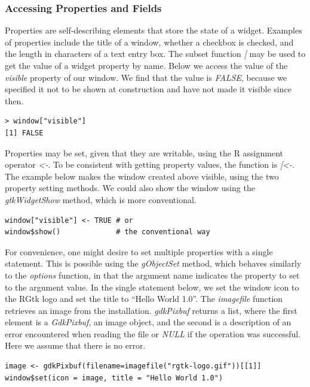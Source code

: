 \documentclass[article]{jss}
\begin{document}
\subsubsection{Accessing Properties and Fields}

Properties are self-describing elements that store the state of a widget.
Examples of properties include the title of a window, whether a checkbox is checked, and
the length in characters of a text entry box. The  subset function 
\emph{[} may be used to get the value of a widget property by name.
Below we access the value of the \emph{visible} property of our window. We
find that the value is \emph{FALSE}, because we specified it not to be shown
at construction and have not made it visible since then.
\begin{verbatim}
> window["visible"]
[1] FALSE
\end{verbatim}

Properties may be set, given that they are writable, using the R assignment 
operator \emph{<-}. To be consistent with getting property values, the function
is \emph{[<-}. The example below makes the window created above visible, using the two
property setting methods. We could also show the window using the 
\emph{gtkWidgetShow} method, which is more conventional.
\begin{verbatim}
window["visible"] <- TRUE # or
window$show()             # the conventional way
\end{verbatim}

For convenience, one might desire to set multiple properties with a single statement.
This is possible using the \emph{gObjectSet} method, which behaves similarly
to the  \emph{options} function, in that the argument name indicates
the property to set to the argument value. In the single statement below, we 
set the window icon to the RGtk logo and set the title to ``Hello World 1.0''. 
The \emph{imagefile} function retrieves an image from the  installation.
\emph{gdkPixbuf} returns a list, where the first element is a \emph{GdkPixbuf}, an image object,
and the second is a description of an error encountered when reading the file
or \emph{NULL} if the operation was successful. Here we assume that there is no error.
\begin{verbatim}
image <- gdkPixbuf(filename=imagefile("rgtk-logo.gif"))[[1]]
window$set(icon = image, title = "Hello World 1.0")
\end{verbatim}
\end{document}
